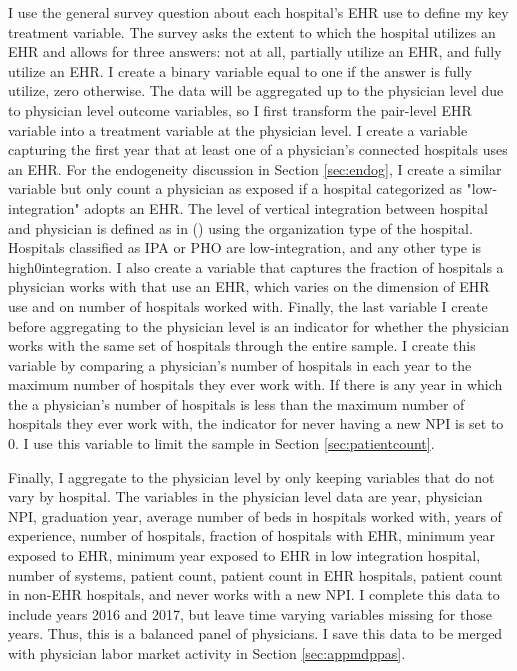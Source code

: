 \documentclass[11pt]{article}
\begin{document}
I use the general survey question about each hospital's EHR use to define my key treatment variable. The survey asks the extent to which the hospital utilizes an EHR and allows for three answers: not at all, partially utilize an EHR, and fully utilize an EHR. I create a binary variable equal to one if the answer is fully utilize, zero otherwise. The data will be aggregated up to the physician level due to physician level outcome variables, so I first transform the pair-level EHR variable into a treatment variable at the physician level. I create a variable capturing the first year that at least one of a physician's connected hospitals uses an EHR. For the endogeneity discussion in Section \ref{sec:endog}, I create a similar variable but only count a physician as exposed if a hospital categorized as "low-integration" adopts an EHR. The level of vertical integration between hospital and physician is defined as in \citeauthor{dynan1998assessing} (\citeyear{dynan1998assessing}) using the organization type of the hospital. Hospitals classified as IPA or PHO are low-integration, and any other type is high0integration. I also create a variable that captures the fraction of hospitals a physician works with that use an EHR, which varies on the dimension of EHR use and on number of hospitals worked with. Finally, the last variable I create before aggregating to the physician level is an indicator for whether the physician works with the same set of hospitals through the entire sample. I create this variable by comparing a physician's number of hospitals in each year to the maximum number of hospitals they ever work with. If there is any year in which the a physician's number of hospitals is less than the maximum number of hospitals they ever work with, the indicator for never having a new NPI is set to 0. I use this variable to limit the sample in Section \ref{sec:patientcount}. 

Finally, I aggregate to the physician level by only keeping variables that do not vary by hospital. The variables in the physician level data are year, physician NPI, graduation year, average number of beds in hospitals worked with, years of experience, number of hospitals, fraction of hospitals with EHR, minimum year exposed to EHR, minimum year exposed to EHR in low integration hospital, number of systems, patient count, patient count in EHR hospitals, patient count in non-EHR hospitals, and never works with a new NPI. I complete this data to include years 2016 and 2017, but leave time varying variables missing for those years. Thus, this is a balanced panel of physicians. I save this data to be merged with physician labor market activity in Section \ref{sec:appmdppas}.
\end{document}
